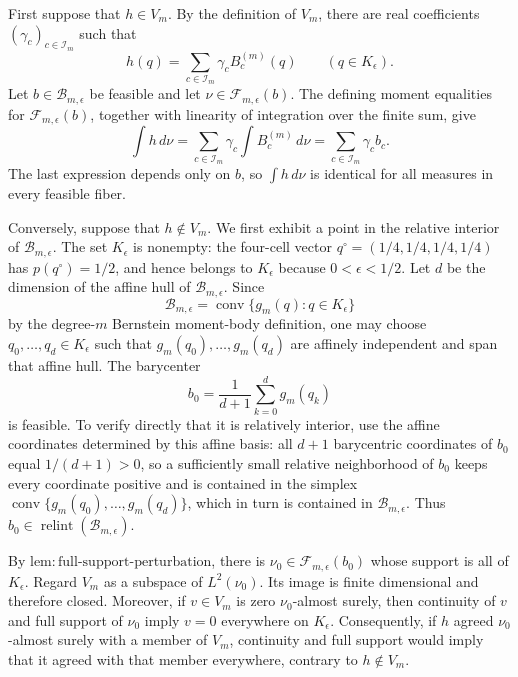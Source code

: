 First suppose that \(h\in V_m\). By the definition of \(V_m\), there are real coefficients \((\gamma_c)_{c\in\mathcal I_m}\) such that
\[
h(q)=\sum_{c\in\mathcal I_m}\gamma_c B_c^{(m)}(q)
\qquad(q\in K_{\epsilon}).
\]
Let \(b\in\mathcal B_{m,\epsilon}\) be feasible and let \(\nu\in\mathcal F_{m,\epsilon}(b)\). The defining moment equalities for \(\mathcal F_{m,\epsilon}(b)\), together with linearity of integration over the finite sum, give
\[
\int h\,d\nu
=\sum_{c\in\mathcal I_m}\gamma_c\int B_c^{(m)}\,d\nu
=\sum_{c\in\mathcal I_m}\gamma_c b_c.
\]
The last expression depends only on \(b\), so \(\int h\,d\nu\) is identical for all measures in every feasible fiber.

Conversely, suppose that \(h\notin V_m\). We first exhibit a point in the relative interior of \(\mathcal B_{m,\epsilon}\). The set \(K_{\epsilon}\) is nonempty: the four-cell vector \(q^{\circ}=(1/4,1/4,1/4,1/4)\) has \(p(q^{\circ})=1/2\), and hence belongs to \(K_{\epsilon}\) because \(0<\epsilon<1/2\). Let \(d\) be the dimension of the affine hull of \(\mathcal B_{m,\epsilon}\). Since
\[
\mathcal B_{m,\epsilon}=\operatorname{conv}\{g_m(q):q\in K_{\epsilon}\}
\]
by the degree-\(m\) Bernstein moment-body definition, one may choose \(q_0,\ldots,q_d\in K_{\epsilon}\) such that \(g_m(q_0),\ldots,g_m(q_d)\) are affinely independent and span that affine hull. The barycenter
\[
b_0=\frac{1}{d+1}\sum_{k=0}^{d}g_m(q_k)
\]
is feasible. To verify directly that it is relatively interior, use the affine coordinates determined by this affine basis: all \(d+1\) barycentric coordinates of \(b_0\) equal \(1/(d+1)>0\), so a sufficiently small relative neighborhood of \(b_0\) keeps every coordinate positive and is contained in the simplex \(\operatorname{conv}\{g_m(q_0),\ldots,g_m(q_d)\}\), which in turn is contained in \(\mathcal B_{m,\epsilon}\). Thus \(b_0\in\operatorname{relint}(\mathcal B_{m,\epsilon})\).

By \(\mathrm{lem{:}full\text{-}support\text{-}perturbation}\), there is \(\nu_0\in\mathcal F_{m,\epsilon}(b_0)\) whose support is all of \(K_{\epsilon}\). Regard \(V_m\) as a subspace of \(L^2(\nu_0)\). Its image is finite dimensional and therefore closed. Moreover, if \(v\in V_m\) is zero \(\nu_0\)-almost surely, then continuity of \(v\) and full support of \(\nu_0\) imply \(v=0\) everywhere on \(K_{\epsilon}\). Consequently, if \(h\) agreed \(\nu_0\)-almost surely with a member of \(V_m\), continuity and full support would imply that it agreed with that member everywhere, contrary to \(h\notin V_m\).

